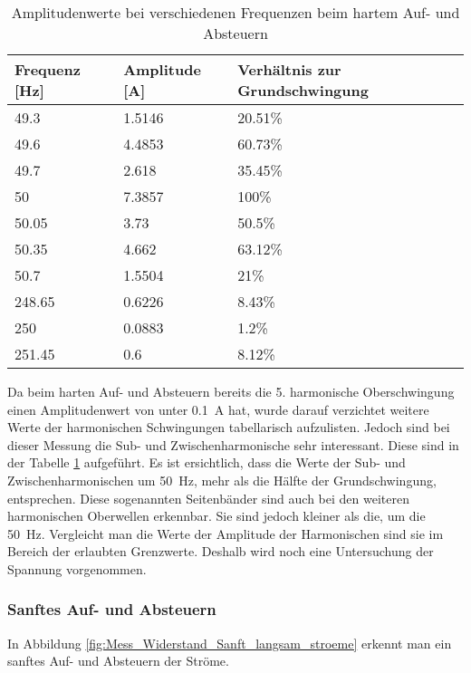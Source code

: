 \begin{table}[ht!]
	\centering
	\begin{tabular}{|l|l|l|}
		\hline
		Frequenz {[}Hz{]} & Amplitude {[}A{]} & Verhältnis zur Grundschwingung	\\ \hline
		49.3              & 1.5146            & 20.51\%							\\ \hline
		49.6              & 4.4853            & 60.73\%							\\ \hline
		49.7              & 2.618             & 35.45\%							\\ \hline
		50                & 7.3857            & 100\%							\\ \hline
		50.05             & 3.73              & 50.5\%							\\ \hline
		50.35             & 4.662             & 63.12\%							\\ \hline
		50.7              & 1.5504            & 21\%							\\ \hline
		248.65            & 0.6226            & 8.43\%							\\ \hline
		250               & 0.0883            & 1.2\%							\\ \hline
		251.45            & 0.6               & 8.12\%							\\ \hline
	\end{tabular}
	\caption{Amplitudenwerte bei verschiedenen Frequenzen beim hartem Auf- und Absteuern}\label{tab:Sanft_stroeme}
\end{table}
Da beim harten Auf- und Absteuern bereits die 5. harmonische Oberschwingung einen Amplitudenwert von unter \SI{0.1}{A} hat, wurde darauf verzichtet weitere Werte der harmonischen Schwingungen tabellarisch aufzulisten. Jedoch sind bei dieser Messung die Sub- und Zwischenharmonische sehr interessant. Diese sind in der Tabelle \ref{tab:Sanft_stroeme} aufgeführt. Es ist ersichtlich, dass die Werte der Sub- und Zwischenharmonischen um \SI{50}{Hz}, mehr als die Hälfte der Grundschwingung, entsprechen. Diese sogenannten Seitenbänder sind auch bei den weiteren harmonischen Oberwellen erkennbar. Sie sind jedoch kleiner als die, um die \SI{50}{Hz}. Vergleicht man die Werte der Amplitude der Harmonischen sind sie im Bereich der erlaubten Grenzwerte. Deshalb wird noch eine Untersuchung der Spannung vorgenommen.


\newpage
\subsubsection*{Sanftes Auf- und Absteuern}\label{sec:Sanft_Widerstand_stroeme}
In Abbildung \ref{fig:Mess_Widerstand_Sanft_langsam_stroeme} erkennt man ein sanftes Auf- und Absteuern der Ströme.

